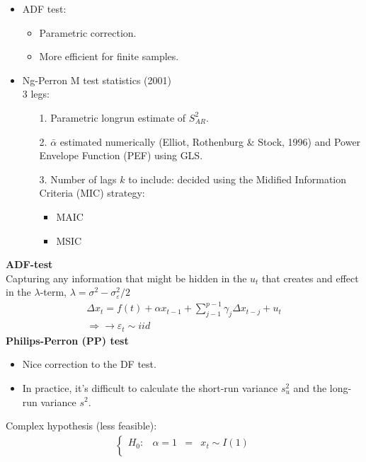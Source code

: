 \begin{multicols}{2}
\begin{itemize}
\begin{itemize}
        \end{itemize}
  \item ADF test:
        \begin{itemize}
         \item Parametric correction.
         \item More efficient for finite samples.
        \end{itemize}
  \item Ng-Perron M test statistics (2001)\\
        3 legs:
        \  \begin{itemize}
         \item[1.] Parametric longrun estimate of $S^2_{AR}$.
         \item[2.] $\bar{\alpha}$ estimated numerically (Elliot, Rothenburg \& Stock, 1996) and Power Envelope Function (PEF) using GLS.
         \item[3.] Number of lags $k$ to include: decided using the Midified Information Criteria (MIC) strategy:
               \begin{itemize}
                \item MAIC
                \item MSIC
               \end{itemize}
        \end{itemize}
 \end{itemize}
 \textbf{ADF-test}\\
 Capturing any information that might be hidden in the $u_t$ that creates and effect in the $\lambda$-term, $\lambda = \sigma^2-\sigma^2_{\varepsilon} / 2$
 \begin{align*}
  \Delta x_t=f(t)+\alpha x_{t-1}+ \sum\limits^{p-1}_{j-1} \gamma_j\Delta x_{t-j} + u_t \\
  \Rightarrow \rightarrow \varepsilon_t\sim iid
 \end{align*}
 \textbf{Philips-Perron (PP) test}\\
 \begin{itemize}
  \item Nice correction to the DF test.
  \item In practice, it's difficult to calculate the short-run variance $s_u^2$ and the long-run  variance $s^2$.
 \end{itemize}
 Complex hypothesis (less feasible):
 \begin{align*}
  \left\{ \begin{array}{cccc}
   H_0: & \alpha=1   & = & x_t\sim I(1) \\

\end{array}
\end{align*}
\end{multicols}
